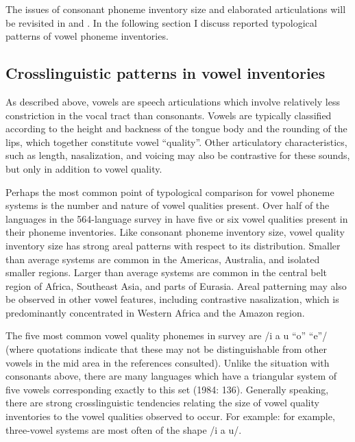   The issues of consonant phoneme inventory size and elaborated articulations will be revisited in  and . In the following section I discuss reported typological patterns of vowel phoneme inventories.

\subsection{Crosslinguistic patterns in vowel inventories}\label{sec:4.1.2}

  As described above, vowels are speech articulations which involve relatively less constriction in the vocal tract than consonants. Vowels are typically classified according to the height and backness of the tongue body and the rounding of the lips, which together constitute vowel ``quality''. Other articulatory characteristics, such as length, nasalization, and voicing may also be contrastive for these sounds, but only in addition to vowel quality.

  Perhaps the most common point of typological comparison for vowel phoneme systems is the number and nature of vowel qualities present. Over half of the languages in the 564-language survey in \citet{Maddieson2013c} have five or six vowel qualities present in their phoneme inventories. Like consonant phoneme inventory size, vowel quality inventory size has strong areal patterns with respect to its distribution. Smaller than average systems are common in the Americas, Australia, and isolated smaller regions. Larger than average systems are common in the central belt region of Africa, Southeast Asia, and parts of Eurasia. Areal patterning may also be observed in other vowel features, including contrastive nasalization, which is predominantly concentrated in Western Africa and the Amazon region.

  The five most common vowel quality phonemes in  survey are /i a u “o” “e”/ (where quotations indicate that these may not be distinguishable from other vowels in the mid area in the references consulted). Unlike the situation with consonants above, there are many languages which have a triangular system of five vowels corresponding exactly to this set (1984: 136). Generally speaking, there are strong crosslinguistic tendencies relating the size of vowel quality inventories to the vowel qualities observed to occur. For example: for example, three-vowel systems are most often of the shape /i a u/. 

